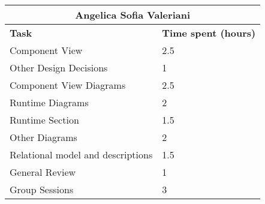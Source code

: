 \begin{table}[H]
  \center
  \begin{tabular}{l|l}
    \multicolumn{2}{c}{\textbf{Angelica Sofia Valeriani}} \\
    \hline
    \textbf{Task} & \textbf{Time spent (hours)}\\
    \hline
    Component View & 2.5 \\
    Other Design Decisions & 1 \\
    Component View Diagrams & 2.5 \\
    Runtime Diagrams & 2 \\
    Runtime Section & 1.5 \\
    Other Diagrams & 2 \\
    Relational model and descriptions & 1.5 \\
    General Review & 1 \\
    Group Sessions & 3 \\
  \end{tabular}
\end{table}
